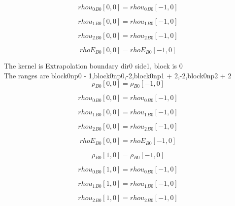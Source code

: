 \documentclass{article}
\begin{document}
\begin{dmath}{rhou_{0}{_{B0}}}[{0,0}] = {rhou_{0}{_{B0}}}[{-1,0}]\end{dmath}

\begin{dmath}{rhou_{1}{_{B0}}}[{0,0}] = {rhou_{1}{_{B0}}}[{-1,0}]\end{dmath}

\begin{dmath}{rhou_{2}{_{B0}}}[{0,0}] = {rhou_{2}{_{B0}}}[{-1,0}]\end{dmath}

\begin{dmath}{rhoE{_{B0}}}[{0,0}] = {rhoE{_{B0}}}[{-1,0}]\end{dmath}

\noindent The kernel is Extrapolation boundary dir0 side1, block is 0\\\noindent The ranges are block0np0 - 1,block0np0,-2,block0np1 + 2,-2,block0np2 + 2\\\begin{dmath}{\rho{_{B0}}}[{0,0}] = {\rho{_{B0}}}[{-1,0}]\end{dmath}

\begin{dmath}{rhou_{0}{_{B0}}}[{0,0}] = {rhou_{0}{_{B0}}}[{-1,0}]\end{dmath}

\begin{dmath}{rhou_{1}{_{B0}}}[{0,0}] = {rhou_{1}{_{B0}}}[{-1,0}]\end{dmath}

\begin{dmath}{rhou_{2}{_{B0}}}[{0,0}] = {rhou_{2}{_{B0}}}[{-1,0}]\end{dmath}

\begin{dmath}{rhoE{_{B0}}}[{0,0}] = {rhoE{_{B0}}}[{-1,0}]\end{dmath}

\begin{dmath}{\rho{_{B0}}}[{1,0}] = {\rho{_{B0}}}[{-1,0}]\end{dmath}

\begin{dmath}{rhou_{0}{_{B0}}}[{1,0}] = {rhou_{0}{_{B0}}}[{-1,0}]\end{dmath}

\begin{dmath}{rhou_{1}{_{B0}}}[{1,0}] = {rhou_{1}{_{B0}}}[{-1,0}]\end{dmath}

\begin{dmath}{rhou_{2}{_{B0}}}[{1,0}] = {rhou_{2}{_{B0}}}[{-1,0}]\end{dmath}
\end{document}
